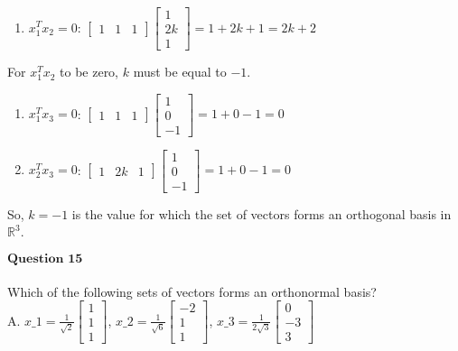 \documentclass[11pt]{article}
\providecommand{\tightlist}{%
      \setlength{\itemsep}{0pt}\setlength{\parskip}{0pt}}
\begin{document}
\begin{enumerate}
\def\labelenumi{\arabic{enumi}.}
\tightlist
\item
  $x_1^Tx_2 = 0$: $
  \begin{bmatrix} 1 & 1 & 1 \end{bmatrix} \begin{bmatrix} 1 \\ 2k \\ 1 \end{bmatrix}
  = 1 + 2k + 1 = 2k + 2 $
\end{enumerate}

For $x_1^Tx_2$ to be zero, $k$ must be equal to $-1$.

\begin{enumerate}
\def\labelenumi{\arabic{enumi}.}
\setcounter{enumi}{1}
\item
  $x_1^Tx_3 = 0$: $
  \begin{bmatrix} 1 & 1 & 1 \end{bmatrix} \begin{bmatrix} 1 \\ 0 \\ -1 \end{bmatrix}
  = 1 + 0 - 1 = 0 $
\item
  $x_2^Tx_3 = 0$: $
  \begin{bmatrix} 1 & 2k & 1 \end{bmatrix} \begin{bmatrix} 1 \\ 0 \\ -1 \end{bmatrix}
  = 1 + 0 - 1 = 0 $
\end{enumerate}

So, $k = -1$ is the value for which the set of vectors forms an
orthogonal basis in $\mathbb{R}^3$.

    $\textbf{Question 15}$\\
~\\
Which of the following sets of vectors forms an orthonormal basis?\\
A. $ x\_1 = \frac{1}{\sqrt{2}}
\begin{bmatrix} 1 \\ 1 \\ 1 \end{bmatrix}
$, $ x\_2 = \frac{1}{\sqrt{6}}
\begin{bmatrix} -2 \\ 1 \\ 1 \end{bmatrix}
$, $ x\_3 = \frac{1}{2\sqrt{3}}
\begin{bmatrix} 0 \\ -3 \\ 3 \end{bmatrix}
$\\
\end{document}

